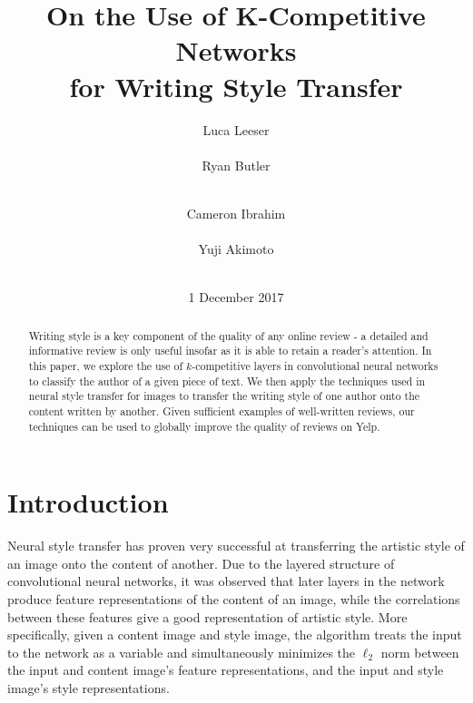 \documentclass{vldb}
\begin{document}

\title{On the Use of K-Competitive Networks \\ for Writing Style Transfer}



\author{
\alignauthor
Luca Leeser\\
       \\
\alignauthor
Ryan Butler\\
       \\
\and
\alignauthor 
Cameron Ibrahim\\
       \\
\alignauthor 
Yuji Akimoto\\
       \\
}

\date{1 December 2017}

\maketitle

\begin{abstract}
Writing style is a key component of the quality of any online review - a detailed and informative review is only useful insofar as it is able to retain a reader's attention. In this paper, we explore the use of $k$-competitive layers in convolutional neural networks to classify the author of a given piece of text. We then apply the techniques used in neural style transfer for images to transfer the writing style of one author onto the content written by another. Given sufficient examples of well-written reviews, our techniques can be used to globally improve the quality of reviews on Yelp.
\end{abstract}

\section{Introduction}
Neural style transfer \cite{GatysEB15a} has proven very successful at transferring the artistic style of an image onto the content of another. Due to the layered structure of convolutional neural networks, it was observed that later layers in the network produce feature representations of the content of an image, while the correlations between these features give a good representation of artistic style. More specifically, given a content image and style image, the algorithm treats the input to the network as a variable and simultaneously minimizes the $\ell_2$ norm between the input and content image's feature representations, and the input and style image's style representations.
\end{document}
